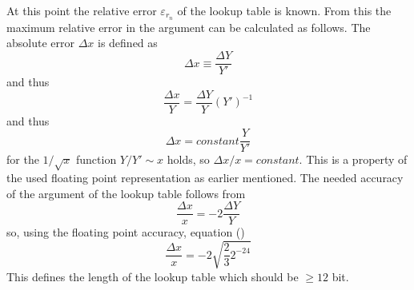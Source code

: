 At this point the relative error $\varepsilon_{r_{n}}$ of the lookup table
is known. From this the maximum relative error in the argument can be 
calculated as follows. The absolute error
$\Delta x$ is defined as
\begin{equation}
\Delta x \equiv \frac{\Delta Y}{Y'}
\end{equation}
and thus
\begin{equation}
\frac{\Delta x}{Y} = \frac{\Delta Y}{Y} (Y')^{-1}
\end{equation}
and thus
\begin{equation}
\Delta x = constant \frac{Y}{Y'}
\end{equation}
for the $1/\sqrt{x}$ function $Y / Y' \sim x$ holds, so
$\Delta x / x = constant$. This is a property of the used floating point
representation as earlier mentioned. The needed accuracy of the argument of the
lookup table follows from
\begin{equation}
\frac{\Delta x}{x} = -2 \frac{\Delta Y}{Y}
\end{equation}
so, using the floating point accuracy, equation ()
\begin{equation}
\frac{\Delta x}{x} = -2 \sqrt{\frac{2}{3} 2^{-24}}
\end{equation}
This defines the length of the lookup table which should be $\geq 12$ bit.

